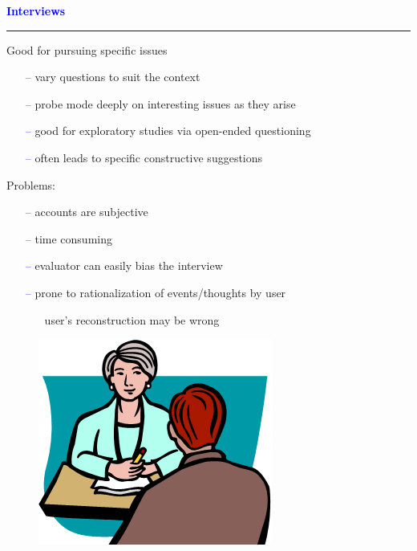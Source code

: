 \documentclass[pdf]{beamer}
\begin{document}
{{\begin{frame}
\begin{center}
{\begin{tabular} { c c c c|c c c|c c }
    \end{tabular}
    }
    \end{center}
\end{frame}}



{
\begin{frame}
	\vspace{8mm}
	\textcolor{Blue}{\textbf{\large{Interviews}}}
    \textcolor{red}{\rule{10cm}{1mm}}
    Good for pursuing specific issues
    \begin{itemize}
      \item[\textcolor{Blue}{--}] vary questions to suit the context
      \item[\textcolor{Blue}{--}] probe mode deeply on interesting issues as they arise
      \item[\textcolor{Blue}{--}] good for exploratory studies via open-ended questioning
      \item[\textcolor{Blue}{--}] often leads to specific constructive suggestions
    \end{itemize}
    \bigskip
    Problems:
    \begin{itemize}
      \item[\textcolor{Blue}{--}] accounts are subjective
      \item[\textcolor{Blue}{--}] time consuming
      \item[\textcolor{Blue}{--}] evaluator can easily bias the interview
      \item[\textcolor{Blue}{--}] prone to rationalization of events/thoughts by user
      \begin{itemize}
      	\item[\textcolor{Blue}{\textbullet}] user's reconstruction may be wrong
      \end{itemize}
    \end{itemize}
    \vspace{-0.3cm}
    \begin{figure}[b]
    	\includegraphics[scale = 0.4, right]{21_Imagine.png}
    \end{figure}
\end{frame}}



}
\end{document}

